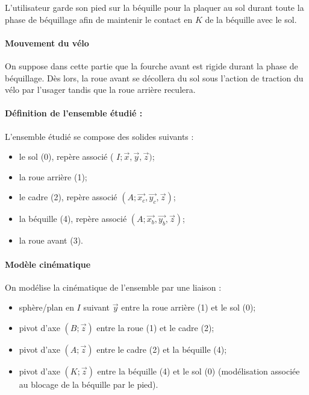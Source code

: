 L'utilisateur garde son pied sur la béquille pour la plaquer au sol durant toute la phase de béquillage afin de maintenir le contact en \(K\) de la béquille avec le sol.

\paragraph*{Mouvement du vélo} On suppose dans cette partie que la fourche avant est rigide durant la phase de béquillage. Dès lors, la roue avant se décollera du sol sous l'action de traction du vélo par l'usager tandis que la roue arrière reculera.

\paragraph*{Définition de l'ensemble étudié :} L'ensemble étudié se compose des solides suivants :
\begin{itemize}
  \item le sol (0), repère associé ( \(I ; \vec{x}, \vec{y}, \vec{z})\);
  \item la roue arrière (1);
  \item le cadre (2), repère associé \(\left(A ; \overrightarrow{x_{c}}, \overrightarrow{y_{c}}, \vec{z}\right)\);
  \item la béquille (4), repère associé \(\left(A ; \overrightarrow{x_{b}}, \overrightarrow{y_{b}}, \vec{z}\right)\);
  \item la roue avant (3).
\end{itemize}


\paragraph*{Modèle cinématique} On modélise la cinématique de l'ensemble par une liaison :

\begin{itemize}
  \item sphère/plan en \(I\) suivant \(\vec{y}\) entre la roue arrière (1) et le sol (0);
  \item pivot d'axe \(( B ; \vec{z})\)  entre la roue (1) et le cadre (2);
  \item pivot d'axe \((A ; \vec{z})\) entre le cadre (2) et la béquille (4);
  \item pivot d'axe \((K ; \vec{z})\) entre la béquille (4) et le sol (0) (modélisation associée au blocage de la béquille par le pied).
\end{itemize}

